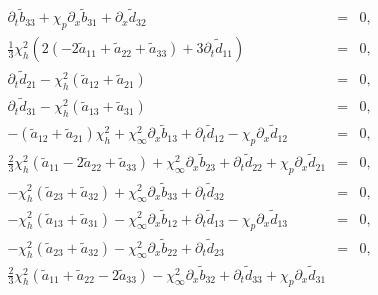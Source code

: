 \documentclass[
10pt, %
a4paper, %
oneside, %
headinclude,footinclude, %
table
]{scrartcl}
\begin{document}
$$\begin{array}{rcl}
\partial_{t}{\tilde{b}_{33}}+\chi _p\partial_{x}{\tilde{b}_{31}}+\partial_{x}{\tilde{d}_{32}}&=&0,\\   
\frac{1}{3}\chi _h^2 \left(2 \left(-2\tilde{a}_{11}+\tilde{a}_{22}+\tilde{a}_{33}\right) +3\partial_{t}{\tilde{d}_{11}}\right)&=&0,\\   
\partial_{t}{\tilde{d}_{21}}-\chi _h^2\left(\tilde{a}_{12}+\tilde{a}_{21}\right) &=&0,\\   
\partial_{t}{\tilde{d}_{31}}-\chi _h^2\left(\tilde{a}_{13}+\tilde{a}_{31}\right) &=&0,\\   
-\left(\tilde{a}_{12}+\tilde{a}_{21}\right) \chi _h^2+\chi _{\infty }^2\partial_{x}{\tilde{b}_{13}}+\partial_{t}{\tilde{d}_{12}}-\chi _p\partial_{x}{\tilde{d}_{12}}&=&0,\\   
\frac{2}{3} \chi _h^2 \left(\tilde{a}_{11}-2\tilde{a}_{22}+\tilde{a}_{33}\right)+\chi _{\infty }^2\partial_{x}{\tilde{b}_{23}}+\partial_{t}{\tilde{d}_{22}}+\chi _p\partial_{x}{\tilde{d}_{21}}&=&0,\\   
-\chi _h^2\left(\tilde{a}_{23}+\tilde{a}_{32}\right) +\chi _{\infty}^2\partial_{x}{\tilde{b}_{33}}+\partial_{t}{\tilde{d}_{32}}&=&0,\\   
-\chi _h^2\left(\tilde{a}_{13}+\tilde{a}_{31}\right)-\chi _{\infty }^2 \partial_{x}{\tilde{b}_{12}}+\partial_{t}{\tilde{d}_{13}}-\chi _p\partial_{x}{\tilde{d}_{13}}&=&0,\\   
- \chi _h^2\left(\tilde{a}_{23}+\tilde{a}_{32}\right)-\chi _{\infty}^2 \partial_{x}{\tilde{b}_{22}}+\partial_{t}{\tilde{d}_{23}}&=&0,\\   
\frac{2}{3}\chi _h^2\left(\tilde{a}_{11}+\tilde{a}_{22}-2 \tilde{a}_{33}\right) -\chi _{\infty }^2\partial_{x}{\tilde{b}_{32}}+\partial_{t}{\tilde{d}_{33}}+\chi _p \partial_{x}{\tilde{d}_{31}}
   \end{array}
   $$
\end{document}
